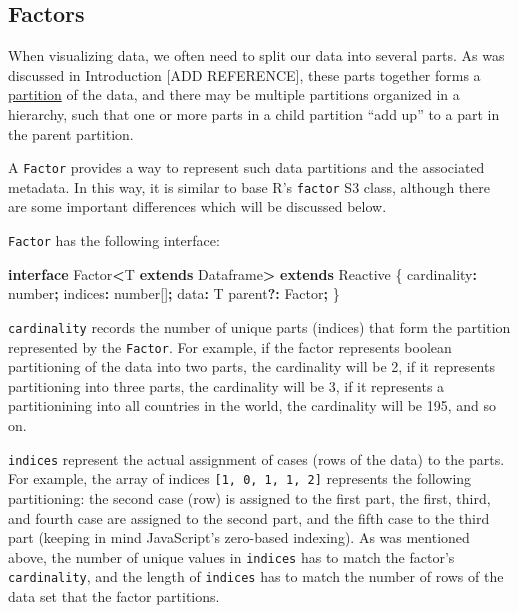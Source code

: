 \documentclass[
]{book}
\newenvironment{Shaded}{\begin{snugshade}}{\end{snugshade}}
\newcommand{\DataTypeTok}[1]{\textcolor[rgb]{0.13,0.29,0.53}{#1}}
\newcommand{\KeywordTok}[1]{\textcolor[rgb]{0.13,0.29,0.53}{\textbf{#1}}}
\newcommand{\NormalTok}[1]{#1}
\newcommand{\OperatorTok}[1]{\textcolor[rgb]{0.81,0.36,0.00}{\textbf{#1}}}
\theoremstyle{definition}
\theoremstyle{definition}
\theoremstyle{definition}
\theoremstyle{definition}
\theoremstyle{remark}
\begin{document}
\subsection{Factors}\label{factors}

When visualizing data, we often need to split our data into several parts. As was discussed in Introduction {[}ADD REFERENCE{]}, these parts together forms a \hyperref[Partitions]{partition} of the data, and there may be multiple partitions organized in a hierarchy, such that one or more parts in a child partition ``add up'' to a part in the parent partition.

A \texttt{Factor} provides a way to represent such data partitions and the associated metadata. In this way, it is similar to base R's \texttt{factor} S3 class, although there are some important differences which will be discussed below.

\texttt{Factor} has the following interface:

\begin{Shaded}
\begin{Highlighting}[]
\KeywordTok{interface}\NormalTok{ Factor}\OperatorTok{\textless{}}\NormalTok{T }\KeywordTok{extends}\NormalTok{ Dataframe}\OperatorTok{\textgreater{}} \KeywordTok{extends}\NormalTok{ Reactive \{}
\NormalTok{  cardinality}\OperatorTok{:} \DataTypeTok{number}\OperatorTok{;}
\NormalTok{  indices}\OperatorTok{:} \DataTypeTok{number}\NormalTok{[]}\OperatorTok{;}
\NormalTok{  data}\OperatorTok{:}\NormalTok{ T}
\NormalTok{  parent}\OperatorTok{?:}\NormalTok{ Factor}\OperatorTok{;}
\NormalTok{\}}
\end{Highlighting}
\end{Shaded}

\texttt{cardinality} records the number of unique parts (indices) that form the partition represented by the \texttt{Factor}. For example, if the factor represents boolean partitioning of the data into two parts, the cardinality will be 2, if it represents partitioning into three parts, the cardinality will be 3, if it represents a partitionining into all countries in the world, the cardinality will be 195, and so on.

\texttt{indices} represent the actual assignment of cases (rows of the data) to the parts. For example, the array of indices \texttt{{[}1,\ 0,\ 1,\ 1,\ 2{]}} represents the following partitioning: the second case (row) is assigned to the first part, the first, third, and fourth case are assigned to the second part, and the fifth case to the third part (keeping in mind JavaScript's zero-based indexing). As was mentioned above, the number of unique values in \texttt{indices} has to match the factor's \texttt{cardinality}, and the length of \texttt{indices} has to match the number of rows of the data set that the factor partitions.
\end{document}
